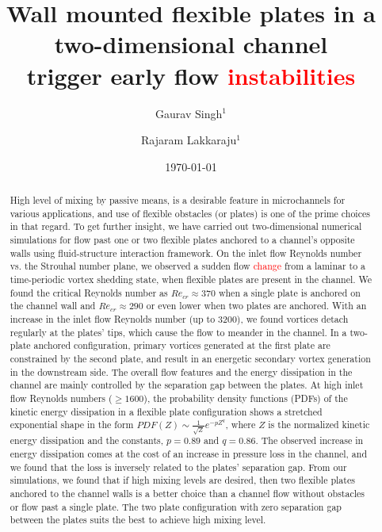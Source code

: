 \documentclass[aps,pre,twocolumn,aps,longbibliography]{revtex4-1}
\begin{document}
	
	
	\title{Wall mounted flexible plates in a two-dimensional channel\\ trigger early flow \textcolor{red}{instabilities}}
	
	
	
	\author{Gaurav Singh$^1$}
	\author{Rajaram Lakkaraju$^1$}%
	\date{\today}
	
	\begin{abstract} 
		
			High level of mixing by passive means, is a desirable feature in microchannels for various applications, and use of flexible obstacles (or plates) is one of the prime choices in that regard. To get further insight, we have carried out two-dimensional numerical simulations for flow past one or two flexible plates anchored to a channel's opposite walls using fluid-structure interaction framework. On the inlet flow Reynolds number vs. the Strouhal number plane, we observed a sudden flow \textcolor{red}{change} from a laminar to a time-periodic vortex shedding state, when flexible plates are present in the channel. We found the critical Reynolds number as $Re_{cr}\approx 370$ when a single plate is anchored on the channel wall and $Re_{cr}\approx 290$ or even lower when two plates are anchored. With an increase in the inlet flow Reynolds number (up to 3200), we found vortices detach regularly at the plates' tips, which cause the flow to meander in the channel. In a two-plate anchored configuration, primary vortices generated at the first plate are constrained by the second plate, and result in an energetic secondary vortex generation in the downstream side. The overall flow features and the energy dissipation in the channel are mainly controlled by the separation gap between the plates. At high inlet flow Reynolds numbers ($\ge 1600$), the probability density functions (PDFs) of the kinetic energy dissipation in a flexible plate configuration shows a stretched exponential shape in the form $PDF(Z)\sim{\frac{1}{{\sqrt{Z}}}e^{-pZ^q}}$, where $Z$ is the normalized kinetic energy dissipation and the constants, $p=0.89$ and $q=0.86$. The observed increase in energy dissipation comes at the cost of an increase in pressure loss in the channel, and we found that the loss is inversely related to the plates' separation gap. From our simulations, we found that if high mixing levels are desired, then two flexible plates anchored to the channel walls is a better choice than a channel flow without obstacles or flow past a single plate. The two plate configuration with zero separation gap between the plates suits the best to achieve high mixing level.
		
		
		
	\end{abstract} 
	
\end{document}

